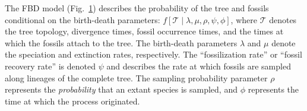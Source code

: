 The FBD model (Fig.\ \ref{fig:fbd_gm}) describes the probability of the tree and fossils conditional on the birth-death parameters: $f[\mathcal{T} \mid \lambda, \mu, \rho, \psi, \phi]$, where $\mathcal{T}$ denotes the tree topology, divergence times, fossil occurrence times, and the times at which the fossils attach to the tree.
The birth-death parameters $\lambda$ and $\mu$ denote the speciation and extinction rates, respectively. The ``fossilization rate'' or ``fossil recovery rate'' is denoted $\psi$ and describes the rate at which fossils are sampled along lineages of the complete tree. The sampling probability parameter $\rho$ represents the \textit{probability} that an extant species is sampled, and $\phi$ represents the time at which the process originated.

\begin{figure}[h!]
\label{fig:fbd_gm}
\end{figure}

